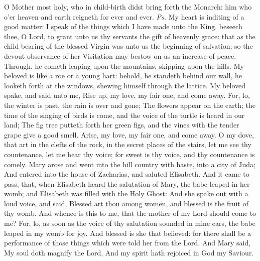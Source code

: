 
\introit
{} O Mother most holy, who in child-birth didst bring forth the Monarch: him who o'er heaven and earth reigneth for ever and ever. \textit{Ps.} My heart is inditing of a good matter: I speak of the things which I have made unto the King.
\collect
{} beseech thee, O Lord, to grant unto us thy servants the gift of heavenly grace: that as the child-bearing of the blessed Virgin was unto us the beginning of salvation; so the devout observance of her Visitation may bestow on us an increase of peace. Through.
 he cometh leaping upon the mountains, skipping upon the hills. My beloved is like a roe or a young hart: behold, he standeth behind our wall, he looketh forth at the windows, shewing himself through the lattice. My beloved spake, and said unto me, Rise up, my love, my fair one, and come away. For, lo, the winter is past, the rain is over and gone; The flowers appear on the earth; the time of the singing of birds is come, and the voice of the turtle is heard in our land; The fig tree putteth forth her green figs, and the vines with the tender grape give a good smell. Arise, my love, my fair one, and come away. O my dove, that art in the clefts of the rock, in the secret places of the stairs, let me see thy countenance, let me hear thy voice; for sweet is thy voice, and thy countenance is comely.
 Mary arose and went into the hill country with haste, into a city of Juda; And entered into the house of Zacharias, and saluted Elisabeth. And it came to pass, that, when Elisabeth heard the salutation of Mary, the babe leaped in her womb; and Elisabeth was filled with the Holy Ghost: And she spake out with a loud voice, and said, Blessed art thou among women, and blessed is the fruit of thy womb. And whence is this to me, that the mother of my Lord should come to me? For, lo, as soon as the voice of thy salutation sounded in mine ears, the babe leaped in my womb for joy. And blessed is she that believed: for there shall be a performance of those things which were told her from the Lord. And Mary said, My soul doth magnify the Lord, And my spirit hath rejoiced in God my Saviour.
